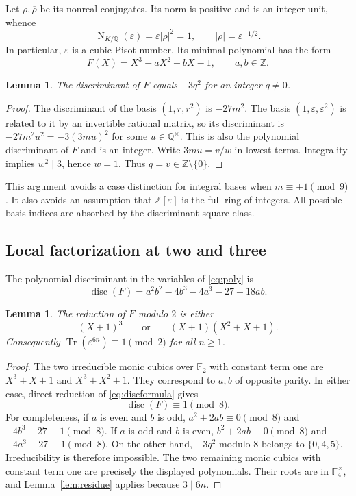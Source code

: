 \documentclass[11pt,a4paper]{article}
\newtheorem{lemma}[theorem]{Lemma}
\theoremstyle{definition}\newtheorem{definition}[theorem]{Definition}
\theoremstyle{remark}\newtheorem{remark}[theorem]{Remark}
\newcommand{\Q}{\mathbb Q}\newcommand{\Z}{\mathbb Z}\newcommand{\N}{\mathbb N}\newcommand{\R}{\mathbb R}\newcommand{\C}{\mathbb C}
\DeclareMathOperator{\Tr}{Tr}\DeclareMathOperator{\Norm}{N}\DeclareMathOperator{\trdeg}{trdeg}\DeclareMathOperator{\ord}{ord}\DeclareMathOperator{\lcm}{lcm}
\begin{document}
Let $\rho,\overline\rho$ be its nonreal conjugates. Its norm is positive and is an integer unit, whence
\begin{equation}\label{eq:norm1}
 \Norm_{K/\Q}(\varepsilon)=\varepsilon|\rho|^2=1,
 \qquad |\rho|=\varepsilon^{-1/2}.
\end{equation}
In particular, $\varepsilon$ is a cubic Pisot number. Its minimal polynomial has the form
\begin{equation}\label{eq:poly}
 F(X)=X^3-aX^2+bX-1,\qquad a,b\in\Z.
\end{equation}

\begin{lemma}\label{lem:disc}
The discriminant of $F$ equals $-3q^2$ for an integer $q\ne0$.
\end{lemma}
\begin{proof}
The discriminant of the basis $(1,r,r^2)$ is $-27m^2$. The basis $(1,\varepsilon,\varepsilon^2)$ is related to it by an invertible rational matrix, so its discriminant is $-27m^2u^2=-3(3mu)^2$ for some $u\in\Q^\times$. This is also the polynomial discriminant of $F$ and is an integer. Write $3mu=v/w$ in lowest terms. Integrality implies $w^2\mid3$, hence $w=1$. Thus $q=v\in\Z\setminus\{0\}$.
\end{proof}

This argument avoids a case distinction for integral bases when $m\equiv\pm1\pmod9$. It also avoids an assumption that $\Z[\varepsilon]$ is the full ring of integers. All possible basis indices are absorbed by the discriminant square class.

\subsection{Local factorization at two and three}
The polynomial discriminant in the variables of \eqref{eq:poly} is
\begin{equation}\label{eq:discformula}
 \operatorname{disc}(F)=a^2b^2-4b^3-4a^3-27+18ab.
\end{equation}

\begin{lemma}\label{lem:mod2}
The reduction of $F$ modulo $2$ is either
\[
 (X+1)^3\qquad\text{or}\qquad (X+1)(X^2+X+1).
\]
Consequently $\Tr(\varepsilon^{6n})\equiv1\pmod2$ for all $n\ge1$.
\end{lemma}
\begin{proof}
The two irreducible monic cubics over $\mathbb F_2$ with constant term one are $X^3+X+1$ and $X^3+X^2+1$. They correspond to $a,b$ of opposite parity. In either case, direct reduction of \eqref{eq:discformula} gives
\[
 \operatorname{disc}(F)\equiv1\pmod8.
\]
For completeness, if $a$ is even and $b$ is odd, $a^2+2ab\equiv0\pmod8$ and $-4b^3-27\equiv1\pmod8$. If $a$ is odd and $b$ is even, $b^2+2ab\equiv0\pmod8$ and $-4a^3-27\equiv1\pmod8$.
On the other hand, $-3q^2$ modulo $8$ belongs to $\{0,4,5\}$. Irreducibility is therefore impossible. The two remaining monic cubics with constant term one are precisely the displayed polynomials. Their roots are in $\mathbb F_4^\times$, and Lemma~\ref{lem:residue} applies because $3\mid6n$.
\end{proof}
\end{document}

